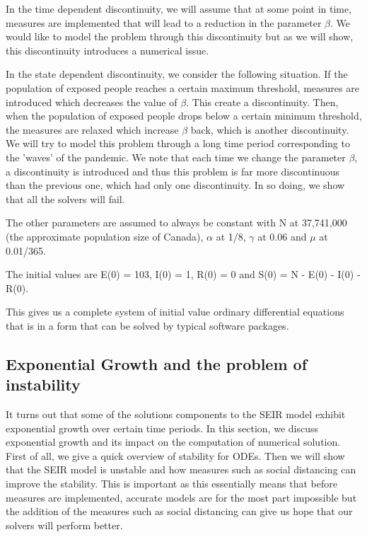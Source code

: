 In the time dependent discontinuity, we will assume that at some point in time, measures are implemented that will lead to a reduction in the parameter $\beta$. We would like to model the problem through this discontinuity but as we will show, this discontinuity introduces a numerical issue.

In the state dependent discontinuity, we consider the following situation. If the population of exposed people reaches a certain maximum threshold, measures are introduced which decreases the value of $\beta$. This create a discontinuity. Then, when the population of exposed people drops below a certain minimum threshold, the measures are relaxed which increase $\beta$ back, which is another discontinuity. We will try to model this problem through a long time period corresponding to the 'waves' of the pandemic. We note that each time we change the parameter $\beta$, a discontinuity is introduced and thus this problem is far more discontinuous than the previous one, which had only one discontinuity. In so doing, we show that all the solvers will fail.

The other parameters are assumed to always be constant with N at 37,741,000 (the approximate population size of Canada), $\alpha$ at 1/8, $\gamma$ at 0.06 and $\mu$ at 0.01/365.

The initial values are E(0) = 103, I(0) = 1, R(0) = 0 and S(0) = N - E(0) - I(0) - R(0).

This gives us a complete system of initial value ordinary differential equations that is in a form that can be solved by typical software packages.

\subsection{Exponential Growth and the problem of instability}
\label{subsection:exponential_growth}
It turns out that some of the solutions components to the SEIR model exhibit exponential growth over certain time periods. In this section, we discuss exponential growth and its impact on the computation of numerical solution. First of all, we give a quick overview of stability for ODEs. Then we will show that the SEIR model is unstable and how measures such as social distancing can improve the stability. This is important as this essentially means that before measures are implemented, accurate models are for the most part impossible but the addition of the measures such as social distancing can give us hope that our solvers will perform better.

